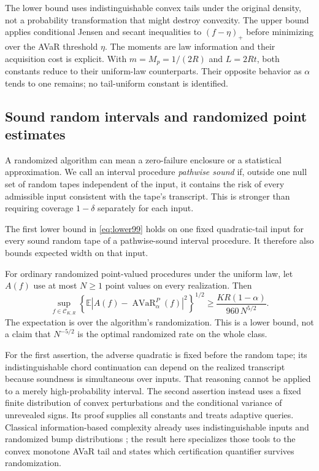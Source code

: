 The lower bound uses indistinguishable convex tails under the original density, not a probability transformation that might destroy convexity. The upper bound applies conditional Jensen and secant inequalities to $(f-\eta)_+$ before minimizing over the AVaR threshold $\eta$. The moments are law information and their acquisition cost is explicit. With $m=M_p=1/(2R)$ and $L=2Rt$, both constants reduce to their uniform-law counterparts. Their opposite behavior as $\alpha$ tends to one remains; no tail-uniform constant is identified.

\subsection{Sound random intervals and randomized point estimates}
A randomized algorithm can mean a zero-failure enclosure or a statistical approximation. We call an interval procedure \emph{pathwise sound} if, outside one null set of random tapes independent of the input, it contains the risk of every admissible input consistent with the tape's transcript. This is stronger than requiring coverage $1-\delta$ separately for each input.

\begin{proposition}\label{prop:random99}
The first lower bound in \eqref{eq:lower99} holds on one fixed quadratic-tail input for every sound random tape of a pathwise-sound interval procedure. It therefore also bounds expected width on that input.

For ordinary randomized point-valued procedures under the uniform law, let $A(f)$ use at most $N\ge1$ point values on every realization. Then
\begin{equation}\label{eq:randomlower99}
 \sup_{f\in\mathcal C_{K,R}}
 \left\{\mathbb E\left|A(f)-\operatorname{AVaR}_\alpha^P(f)\right|^2\right\}^{1/2}
 \ge\frac{KR(1-\alpha)}{960\,N^{5/2}}.
\end{equation}
The expectation is over the algorithm's randomization. This is a lower bound, not a claim that $N^{-5/2}$ is the optimal randomized rate on the whole class.
\end{proposition}

For the first assertion, the adverse quadratic is fixed before the random tape; its indistinguishable chord continuation can depend on the realized transcript because soundness is simultaneous over inputs. That reasoning cannot be applied to a merely high-probability interval. The second assertion instead uses a fixed finite distribution of convex perturbations and the conditional variance of unrevealed signs. Its proof supplies all constants and treats adaptive queries. Classical information-based complexity already uses indistinguishable inputs and randomized bump distributions \citep{Novak2015Integration97}; the result here specializes those tools to the convex monotone AVaR tail and states which certification quantifier survives randomization.

